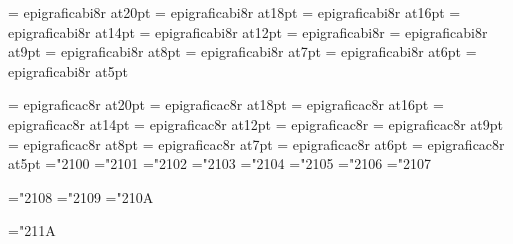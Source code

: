 \font\twentyslbf=      epigraficabi8r at20pt
\font\eighteenslbf=    epigraficabi8r at18pt
\font\sixteenslbf=     epigraficabi8r at16pt
\font\fourteenslbf=    epigraficabi8r at14pt
\font\twelveslbf=      epigraficabi8r at12pt
\font\slbf=            epigraficabi8r
\font\nineslbf=        epigraficabi8r at9pt
\font\eightslbf=       epigraficabi8r at8pt
\font\sevenslbf=       epigraficabi8r at7pt
\font\sixslbf=         epigraficabi8r at6pt
\font\fiveslbf=        epigraficabi8r at5pt

\font\twentycaps=      epigraficac8r at20pt
\font\eighteencaps=    epigraficac8r at18pt
\font\sixteencaps=     epigraficac8r at16pt
\font\fourteencaps=    epigraficac8r at14pt
\font\twelvecaps=      epigraficac8r at12pt
\font\caps=            epigraficac8r
\font\ninecaps=        epigraficac8r at9pt
\font\eightcaps=       epigraficac8r at8pt
\font\sevencaps=       epigraficac8r at7pt
\font\sixcaps=         epigraficac8r at6pt
\font\fivecaps=        epigraficac8r at5pt
%
%
\mathchardef\Gamma="2100
\mathchardef\Delta="2101
\mathchardef\Theta="2102
\mathchardef\Lambda="2103
\mathchardef\Xi="2104
\mathchardef\Pi="2105
\mathchardef\Sigma="2106
\mathchardef\Upsilon="2107

\mathchardef\Phi="2108
\mathchardef\Psi="2109
\mathchardef\Omega="210A

\mathchardef\varrho="211A

%
\rm 